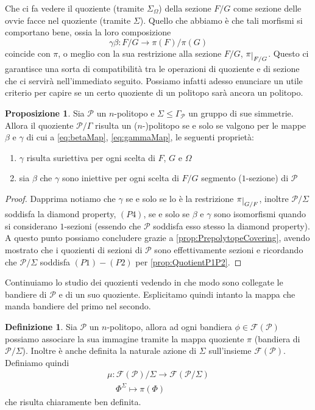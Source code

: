 \documentclass[a4paper,12pt]{report}
\newcommand{\p}{\mathcal{P}}
\theoremstyle{plain}
\theoremstyle{definition}
\newtheorem{defin}[teo]{Definizione}
\newtheorem{prop}[teo]{Proposizione}
\newcommand\flag[1]{\mathcal{F}(#1)}
\def\restrict#1{\raise-.5ex\hbox{\ensuremath|}_{#1}}
\begin{document}
Che ci fa vedere il quoziente (tramite $\Sigma_\Omega$) della sezione $F/G$ come sezione delle ovvie facce nel quoziente (tramite $\Sigma$).
Quello che abbiamo \`e che tali morfismi si comportano bene, ossia la loro composizione
\begin{equation*}
\gamma\beta:F/G\longrightarrow\pi(F)/\pi(G)
\end{equation*}
coincide con $\pi$, o meglio con la sua restrizione alla sezione $F/G$, $\pi\restrict{F/G}$. Questo ci garantisce una sorta di compatibilit\`a tra
le operazioni di quoziente e di sezione che ci servir\`a nell'immediato seguito.
Possiamo infatti adesso enunciare un utile criterio per capire se un certo quoziente di un politopo sar\`a ancora un politopo.
\begin{prop}
\label{prop:QuotientIsPolitope}
Sia $\p$ un $n$-politopo e $\Sigma\leq\Gamma_\p$ un gruppo di sue simmetrie. Allora il quoziente $\p/\Gamma$ risulta un ($n$-)politopo se e solo se
valgono per le mappe $\beta$ e $\gamma$ di cui a \ref{eq:betaMap}, \ref{eq:gammaMap}, le seguenti propriet\`a:
\begin{enumerate}
\item$\gamma$ risulta suriettiva per ogni scelta di $F$, $G$ e $\Omega$\\
\item sia $\beta$ che $\gamma$ sono iniettive per ogni scelta di $F/G$ segmento ($1$-sezione) di $\p$
\end{enumerate}
\end{prop}
\begin{proof}
Dapprima notiamo che $\gamma$ se e solo se lo \`e la restrizione $\pi\restrict{G/F}$, inoltre $\p/\Sigma$ soddisfa la diamond property, $(P4)$, 
se e solo se $\beta$ e $\gamma$ sono isomorfismi quando si considerano $1$-sezioni (essendo che $\p$ soddisfa esso stesso la diamond property).
A questo punto possiamo concludere grazie a \ref{prop:PrepolytopeCovering}, avendo mostrato che i quozienti di sezioni di $\p$ sono effettivamente
sezioni e ricordando che $\p/\Sigma$ soddisfa $(P1)-(P2)$ per \ref{prop:QuotientP1P2}.
\end{proof}
Continuiamo lo studio dei quozienti vedendo in che modo sono collegate le bandiere di $\p$ e di un suo quoziente. Esplicitamo quindi intanto la mappa che
manda bandiere del primo nel secondo.
\begin{defin}
\label{def:mu}
Sia $\p$ un $n$-politopo, allora ad ogni bandiera $\phi\in\flag{\p}$ possiamo associare la sua immagine tramite la mappa quoziente $\pi$
(bandiera di $\p/\Sigma$). Inoltre \`e anche definita la naturale azione di $\Sigma$ sull'insieme $\flag{\p}$. Definiamo quindi
\begin{gather*}
\mu:\flag{\p}/\Sigma\longrightarrow\flag{\p/\Sigma}\\
\quad\Phi^\Sigma\longmapsto\pi(\Phi)
\end{gather*}
che risulta chiaramente ben definita.
\end{defin}
\end{document}
